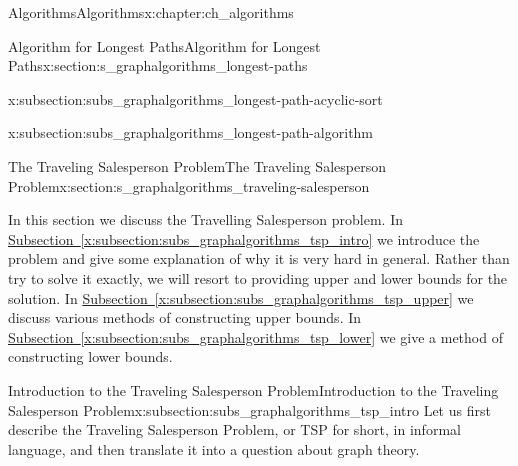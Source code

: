\documentclass[oneside,10pt,]{book}
\newcommand{\xreffont}{\relax}
\numberwithin{equation}{section}
\begin{document}
\begin{chapterptx}{Algorithms}{}{Algorithms}{}{}{x:chapter:ch_algorithms}
\begin{sectionptx}{Algorithm for Longest Paths}{}{Algorithm for Longest Paths}{}{}{x:section:s_graphalgorithms_longest-paths}
%
%
\typeout{************************************************}
\typeout{************************************************}
%
\begin{subsectionptx}{}{}{}{}{}{x:subsection:subs_graphalgorithms_longest-path-acyclic-sort}
\end{subsectionptx}
%
%
\typeout{************************************************}
\typeout{************************************************}
%
\begin{subsectionptx}{}{}{}{}{}{x:subsection:subs_graphalgorithms_longest-path-algorithm}
\end{subsectionptx}
\end{sectionptx}
%
%
\typeout{************************************************}
\typeout{************************************************}
%
\begin{sectionptx}{The Traveling Salesperson Problem}{}{The Traveling Salesperson Problem}{}{}{x:section:s_graphalgorithms_traveling-salesperson}
\begin{introduction}{}%
In this section we discuss the Travelling Salesperson problem.  In \hyperref[x:subsection:subs_graphalgorithms_tsp_intro]{Subsection~{\xreffont\ref{x:subsection:subs_graphalgorithms_tsp_intro}}}  we introduce the problem and give some explanation of why it is very hard in general.  Rather than try to solve it exactly, we will resort to providing upper and lower bounds for the solution.  In \hyperref[x:subsection:subs_graphalgorithms_tsp_upper]{Subsection~{\xreffont\ref{x:subsection:subs_graphalgorithms_tsp_upper}}}  we discuss various methods of constructing upper bounds.  In \hyperref[x:subsection:subs_graphalgorithms_tsp_lower]{Subsection~{\xreffont\ref{x:subsection:subs_graphalgorithms_tsp_lower}}}  we give a method of constructing lower bounds.%
\end{introduction}%
%
%
\typeout{************************************************}
\typeout{************************************************}
%
\begin{subsectionptx}{Introduction to the Traveling Salesperson Problem}{}{Introduction to the Traveling Salesperson Problem}{}{}{x:subsection:subs_graphalgorithms_tsp_intro}
Let us first describe the Traveling Salesperson Problem, or TSP for short, in informal language, and then translate it into a question about graph theory.%
\par

\end{subsectionptx}
\end{sectionptx}
\end{chapterptx}
\end{document}
